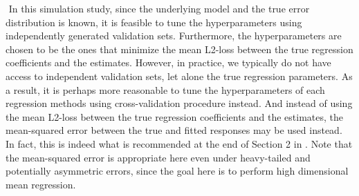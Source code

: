 $ $\newline
In this simulation study, since the underlying model and the true error distribution is known, it is feasible to tune the hyperparameters using independently generated validation sets. Furthermore, the hyperparameters are chosen to be the ones that minimize the mean L2-loss between the true regression coefficients and the estimates. However, in practice, we typically do not have access to independent validation sets, let alone the true regression parameters. As a result, it is perhaps more reasonable to tune the hyperparameters of each regression methods using cross-validation procedure instead. And instead of using the mean L2-loss between the true regression coefficients and the estimates, the mean-squared error between the true and fitted responses may be used instead. In fact, this is indeed what is recommended at the end of Section 2 in \citet{fan2017estimation}. Note that the mean-squared error is appropriate here even under heavy-tailed and potentially asymmetric errors, since the goal here is to perform high dimensional mean regression.